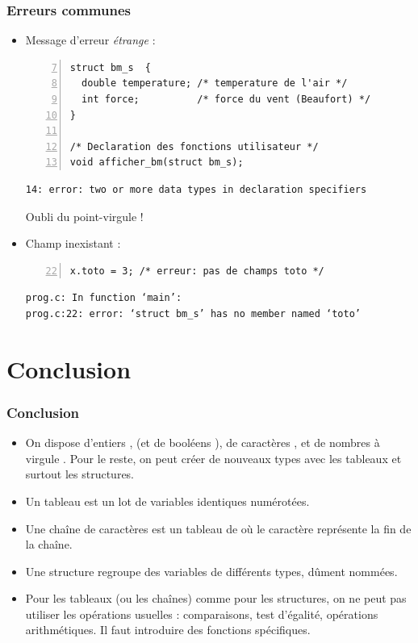 \documentclass[xcolor=pdftex,svgnames,table]{beamer}
\begin{document}
\begin{frame}[fragile]
  \frametitle{Erreurs communes}

\begin{itemize}
\item Message d'erreur \emph{étrange} :
\begin{lstlisting}[numbers=left,basicstyle=\ttfamily\small,firstnumber=7]
struct bm_s  {
  double temperature; /* temperature de l'air */
  int force;          /* force du vent (Beaufort) */
}

/* Declaration des fonctions utilisateur */
void afficher_bm(struct bm_s);
\end{lstlisting}
{\small
\begin{verbatim}
14: error: two or more data types in declaration specifiers
\end{verbatim}
}
\pause
\alert{Oubli du point-virgule !}
\pause
\item Champ inexistant :
\begin{lstlisting}[numbers=left,basicstyle=\ttfamily\small,firstnumber=22]
  x.toto = 3; /* erreur: pas de champs toto */
\end{lstlisting}
{\small
\begin{verbatim}
prog.c: In function ‘main’:
prog.c:22: error: ‘struct bm_s’ has no member named ‘toto’
\end{verbatim}
}
\end{itemize}
\end{frame}

\section{Conclusion}
\begin{frame}
  \frametitle{Conclusion}
  \begin{itemize}
  \item On dispose d'entiers , (et de booléens ), de
    caractères , et de nombres à virgule . Pour le
    reste, on peut créer de nouveaux types avec les tableaux et
    surtout les structures.\pause
  \item Un tableau est un \alert{lot de  variables
      identiques numérotées}.\pause
  \item Une \alert{chaîne de caractères} est un tableau de  où le
    caractère  représente la fin de la chaîne.
  \item Une structure  \alert{regroupe
      des variables  de différents types},
    dûment nommées. \pause
  \item Pour les tableaux (ou les chaînes) comme pour les structures,
    on ne peut pas utiliser les opérations usuelles : comparaisons, test
    d'égalité, opérations arithmétiques. Il faut introduire des
    fonctions spécifiques.
  \end{itemize}
  \end{frame}
\end{document}

